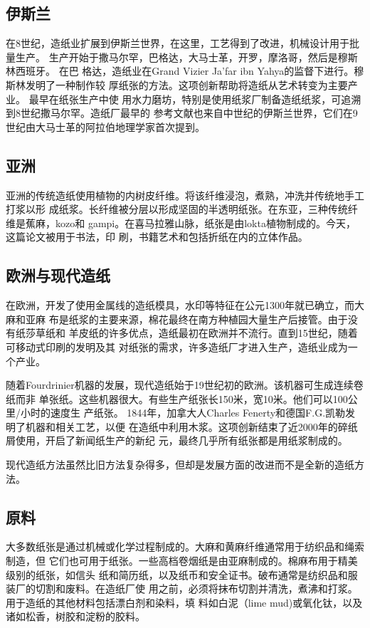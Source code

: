 \documentclass[11pt]{article}
\begin{document}
\subsection{伊斯兰}
\label{sec:org6c1ae40}
在8世纪，造纸业扩展到伊斯兰世界，在这里，工艺得到了改进，机械设计用于批量生产。
生产开始于撒马尔罕，巴格达，大马士革，开罗，摩洛哥，然后是穆斯林西班牙。
\cite{Mahdavi_2003} 在巴
格达，造纸业在Grand Vizier Ja'far ibn Yahya的监督下进行。穆斯林发明了一种制作较
厚纸张的方法。这项创新帮助将造纸从艺术转变为主要产业。
\cite{a_study_of_the_ancient_craft,Mahdavi_2003}  最早在纸张生产中使
用水力磨坊，特别是使用纸浆厂制备造纸纸浆，可追溯到8世纪撒马尔罕。造纸厂最早的
参考文献也来自中世纪的伊斯兰世界，它们在9世纪由大马士革的阿拉伯地理学家首次提到。

\subsection{亚洲}
\label{sec:org11e291b}
亚洲的传统造纸使用植物的内树皮纤维。将该纤维浸泡，煮熟，冲洗并传统地手工打浆以形
成纸浆。长纤维被分层以形成坚固的半透明纸张。在东亚，三种传统纤维是蕉麻，kozo和
gampi。在喜马拉雅山脉，纸张是由lokta植物制成的。今天，这篇论文被用于书法，印
刷，书籍艺术和包括折纸在内的立体作品。

\subsection{欧洲与现代造纸}
\label{sec:org758e024}
在欧洲，开发了使用金属线的造纸模具，水印等特征在公元1300年就已确立，而大麻和亚麻
布是纸浆的主要来源，棉花最终在南方种植园大量生产后接管。由于没有纸莎草纸和
羊皮纸的许多优点，造纸最初在欧洲并不流行。直到15世纪，随着可移动式印刷的发明及其
对纸张的需求，许多造纸厂才进入生产，造纸业成为一个产业。

随着Fourdrinier机器的发展，现代造纸始于19世纪初的欧洲。该机器可生成连续卷纸而非
单张纸。这些机器很大。有些生产纸张长150米，宽10米。他们可以100公里/小时的速度生
产纸张。 1844年，加拿大人Charles Fenerty和德国F.G.凯勒发明了机器和相关工艺，以便
在造纸中利用木浆。这项创新结束了近2000年的碎纸屑使用，开启了新闻纸生产的新纪
元，最终几乎所有纸张都是用纸浆制成的。

现代造纸方法虽然比旧方法复杂得多，但却是发展方面的改进而不是全新的造纸方法。

\subsection{原料}
\label{sec:org1879875}
大多数纸张是通过机械或化学过程制成的。大麻和黄麻纤维通常用于纺织品和绳索制造，但
它们也可用于纸张。一些高档卷烟纸是由亚麻制成的。棉麻布用于精美级别的纸张，如信头
纸和简历纸，以及纸币和安全证书。破布通常是纺织品和服装厂的切割和废料。在造纸厂使
用之前，必须将抹布切割并清洗，煮沸和打浆。用于造纸的其他材料包括漂白剂和染料，填
料如白泥（lime mud)或氧化钛，以及诸如松香，树胶和淀粉的胶料。
\end{document}
